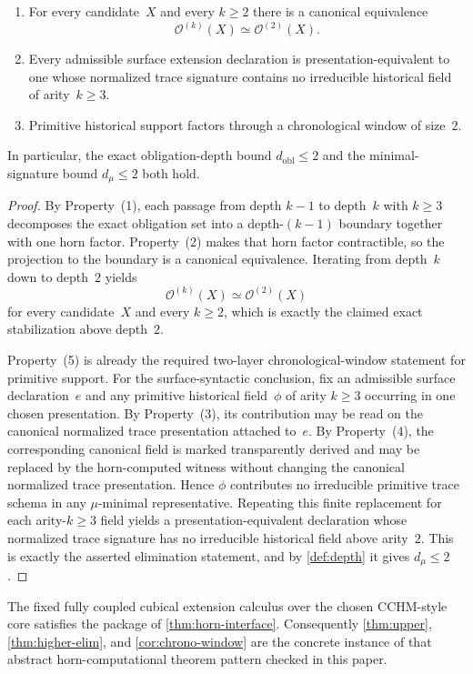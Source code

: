 \documentclass{lmcs}
\newcommand{\Ocal}{\mathcal{O}}
\begin{document}
\begin{thm}
\begin{enumerate}
  \item For every candidate~$X$ and every $k \geq 2$ there is a canonical equivalence
  \[
    \Ocal^{(k)}(X) \simeq \Ocal^{(2)}(X).
  \]
  \item Every admissible surface extension declaration is presentation-equivalent to one whose normalized trace signature contains no irreducible historical field of arity~$k \geq 3$.
  \item Primitive historical support factors through a chronological window of size~$2$.
\end{enumerate}
In particular, the exact obligation-depth bound $d_{\mathrm{obl}} \leq 2$ and the minimal-signature bound $d_\mu \leq 2$ both hold.
\end{thm}

\begin{proof}
By Property~(1), each passage from depth $k-1$ to depth~$k$ with $k \geq 3$ decomposes the exact obligation set into a depth-$(k-1)$ boundary together with one horn factor. Property~(2) makes that horn factor contractible, so the projection to the boundary is a canonical equivalence. Iterating from depth~$k$ down to depth~$2$ yields
\[
  \Ocal^{(k)}(X) \simeq \Ocal^{(2)}(X)
\]
for every candidate~$X$ and every $k \geq 2$, which is exactly the claimed exact stabilization above depth~$2$.

Property~(5) is already the required two-layer chronological-window statement for primitive support. For the surface-syntactic conclusion, fix an admissible surface declaration~$e$ and any primitive historical field~$\phi$ of arity $k \geq 3$ occurring in one chosen presentation. By Property~(3), its contribution may be read on the canonical normalized trace presentation attached to~$e$. By Property~(4), the corresponding canonical field is marked transparently derived and may be replaced by the horn-computed witness without changing the canonical normalized trace presentation. Hence $\phi$ contributes no irreducible primitive trace schema in any $\mu$-minimal representative. Repeating this finite replacement for each arity-$k \geq 3$ field yields a presentation-equivalent declaration whose normalized trace signature has no irreducible historical field above arity~$2$. This is exactly the asserted elimination statement, and by \autoref{def:depth} it gives $d_\mu \leq 2$.
\end{proof}

\begin{cor}
\label{cor:cubical-horn-interface}
The fixed fully coupled cubical extension calculus over the chosen CCHM-style core satisfies the package of \autoref{thm:horn-interface}. Consequently \autoref{thm:upper}, \autoref{thm:higher-elim}, and \autoref{cor:chrono-window} are the concrete instance of that abstract horn-computational theorem pattern checked in this paper.
\end{cor}
\end{document}
